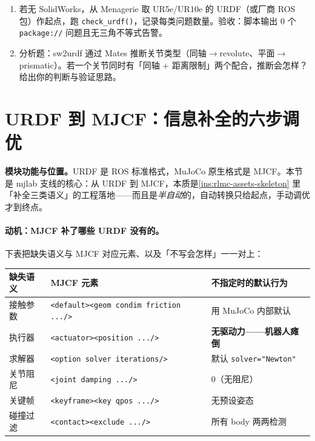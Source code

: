 \begin{practice}
\begin{enumerate}
  \item 若无 SolidWorks，从 Menagerie 取 UR5e/UR10e 的 URDF（或厂商 ROS 包）作起点，跑 \texttt{check\_urdf()}，记录每类问题数量。验收：脚本输出 0 个 \texttt{package://} 问题且无三角不等式告警。
  \item 分析题：sw2urdf 通过 Mates 推断关节类型（同轴$\to$revolute、平面$\to$prismatic）。若一个关节同时有「同轴 + 距离限制」两个配合，推断会怎样？给出你的判断与验证思路。
\end{enumerate}
\end{practice}

\section{URDF 到 MJCF：信息补全的六步调优}
\label{sec:rlmc-assets-mjcf}

\textbf{模块功能与位置。}URDF 是 ROS 标准格式，MuJoCo 原生格式是 MJCF。本节是 mjlab 支线的核心：从 URDF 到 MJCF，本质是\cref{ins:rlmc-assets-skeleton} 里「补全三类语义」的工程落地——而且是\emph{半自动}的，自动转换只给起点，手动调优才到终点。

\paragraph{动机：MJCF 补了哪些 URDF 没有的。}下表把缺失语义与 MJCF 对应元素、以及「不写会怎样」一一对上：

\begin{center}
\small
\begin{tabular}{@{}lll@{}}
\toprule
缺失语义 & MJCF 元素 & 不指定时的默认行为 \\
\midrule
接触参数 & \texttt{<default><geom condim friction .../\allowbreak >} & 用 MuJoCo 内部默认 \\
执行器 & \texttt{<actuator><position .../\allowbreak >} & \textbf{无驱动力——机器人瘫倒} \\
求解器 & \texttt{<option solver iterations/\allowbreak >} & 默认 \texttt{solver="Newton"} \\
关节阻尼 & \texttt{<joint damping .../\allowbreak >} & 0（无阻尼） \\
关键帧 & \texttt{<keyframe><key qpos .../\allowbreak >} & 无预设姿态 \\
碰撞过滤 & \texttt{<contact><exclude .../\allowbreak >} & 所有 body 两两检测 \\
\bottomrule
\end{tabular}
\end{center}


